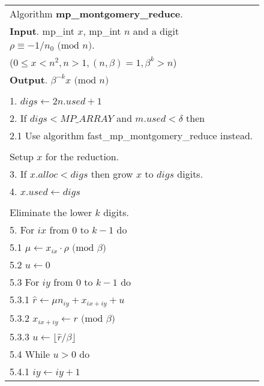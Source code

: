 \documentclass[b5paper]{book}
\begin{document}
\newpage\begin{figure}[!here]
\begin{small}
\begin{center}
\begin{tabular}{l}
\hline Algorithm \textbf{mp\_montgomery\_reduce}. \\
\textbf{Input}.   mp\_int $x$, mp\_int $n$ and a digit $\rho \equiv -1/n_0 \mbox{ (mod }n\mbox{)}$. \\
\hspace{11.5mm}($0 \le x < n^2, n > 1, (n, \beta) = 1, \beta^k > n$) \\
\textbf{Output}.  $\beta^{-k}x \mbox{ (mod }n\mbox{)}$ \\
\hline \\
1.  $digs \leftarrow 2n.used + 1$ \\
2.  If $digs < MP\_ARRAY$ and $m.used < \delta$ then \\
\hspace{3mm}2.1  Use algorithm fast\_mp\_montgomery\_reduce instead. \\
\\
Setup $x$ for the reduction. \\
3.  If $x.alloc < digs$ then grow $x$ to $digs$ digits. \\
4.  $x.used \leftarrow digs$ \\
\\
Eliminate the lower $k$ digits. \\
5.  For $ix$ from $0$ to $k - 1$ do \\
\hspace{3mm}5.1  $\mu \leftarrow x_{ix} \cdot \rho \mbox{ (mod }\beta\mbox{)}$ \\
\hspace{3mm}5.2  $u \leftarrow 0$ \\
\hspace{3mm}5.3  For $iy$ from $0$ to $k - 1$ do \\
\hspace{6mm}5.3.1  $\hat r \leftarrow \mu n_{iy} + x_{ix + iy} + u$ \\
\hspace{6mm}5.3.2  $x_{ix + iy} \leftarrow \hat r \mbox{ (mod }\beta\mbox{)}$ \\
\hspace{6mm}5.3.3  $u \leftarrow \lfloor \hat r / \beta \rfloor$ \\
\hspace{3mm}5.4  While $u > 0$ do \\
\hspace{6mm}5.4.1  $iy \leftarrow iy + 1$ \\

\end{tabular}
\end{center}
\end{small}
\end{figure}
\end{document}
